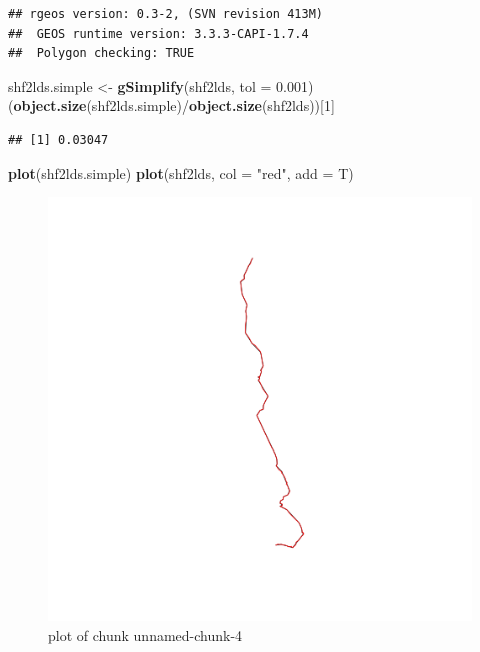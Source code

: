 \documentclass[]{article}
\makeatletter
\newenvironment{Shaded}{}{}
\newcommand{\KeywordTok}[1]{\textcolor[rgb]{0.00,0.44,0.13}{\textbf{{#1}}}}
\newcommand{\DataTypeTok}[1]{\textcolor[rgb]{0.56,0.13,0.00}{{#1}}}
\newcommand{\DecValTok}[1]{\textcolor[rgb]{0.25,0.63,0.44}{{#1}}}
\newcommand{\FloatTok}[1]{\textcolor[rgb]{0.25,0.63,0.44}{{#1}}}
\newcommand{\StringTok}[1]{\textcolor[rgb]{0.25,0.44,0.63}{{#1}}}
\newcommand{\NormalTok}[1]{{#1}}
\def\maxwidth{\ifdim\Gin@nat@width>\linewidth\linewidth
\else\Gin@nat@width\fi}
\let\Oldincludegraphics\includegraphics
\renewcommand{\includegraphics}[1]{\Oldincludegraphics[width=\maxwidth]{#1}}
\makeatother
\begin{document}
\begin{verbatim}
## rgeos version: 0.3-2, (SVN revision 413M)
##  GEOS runtime version: 3.3.3-CAPI-1.7.4 
##  Polygon checking: TRUE
\end{verbatim}

\begin{Shaded}
\begin{Highlighting}[]
\NormalTok{shf2lds.simple <-}\StringTok{ }\KeywordTok{gSimplify}\NormalTok{(shf2lds, }\DataTypeTok{tol =} \FloatTok{0.001}\NormalTok{)}
\NormalTok{(}\KeywordTok{object.size}\NormalTok{(shf2lds.simple)/}\KeywordTok{object.size}\NormalTok{(shf2lds))[}\DecValTok{1}\NormalTok{]}
\end{Highlighting}
\end{Shaded}

\begin{verbatim}
## [1] 0.03047
\end{verbatim}

\begin{Shaded}
\begin{Highlighting}[]
\KeywordTok{plot}\NormalTok{(shf2lds.simple)}
\KeywordTok{plot}\NormalTok{(shf2lds, }\DataTypeTok{col =} \StringTok{"red"}\NormalTok{, }\DataTypeTok{add =} \NormalTok{T)}
\end{Highlighting}
\end{Shaded}

\begin{figure}[htbp]
\centering
\includegraphics{figure/unnamed-chunk-4.png}
\caption{plot of chunk unnamed-chunk-4}
\end{figure}
\end{document}
